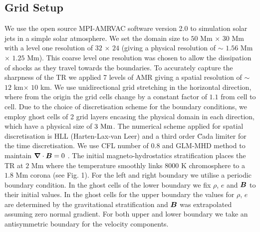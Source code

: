 \subsection{Grid Setup}
\label{sec:Grid_Setup}
We use the open source MPI-AMRVAC software version 2.0 \cite{Xia_2017} to simulation solar jets in a simple solar atmosphere. We set the domain size to $50$ Mm $\times$ $30$ Mm with a level one resolution of $32$ $\times$ $24$ (giving a physical resolution of $\sim$ $1.56$ Mm $\times$ $1.25$ Mm). This coarse level one resolution was chosen to allow the dissipation of shocks as they travel towards the boundaries. To accurately capture the sharpness of the TR we applied 7 levels of AMR giving a spatial resolution of $\sim$ $12$ km$\times$ $10$ km. We use unidirectional grid stretching in the horizontal direction, where from the origin the grid cells change by a constant factor of $1.1$ from cell to cell. Due to the choice of discretisation scheme for the boundary conditions, we employ ghost cells of 2 grid layers encasing the physical domain in each direction, which have a physical size of $3 \ \rm{Mm}$. The numerical scheme applied for spatial discretisation is HLL (Harten-Lax-van Leer) \cite{hll_1983} and a third order \u{C}ada limiter \citep{CADA20094118} for the time discretisation. We use CFL number of $0.8$ and GLM-MHD method to maintain $\boldsymbol{\nabla} \cdot \boldsymbol{B}=0$ \citep{DEDNER2002645}. The initial magneto-hydrostatics stratification places the TR at $2$ Mm where the temperature smoothly links $8000$ K chromosphere to a $1.8$ Mm corona (see Fig. 1). For the left and right boundary we utilise a periodic boundary condition. In the  ghost cells of the lower boundary we fix $\rho$, $e$ and $\boldsymbol{B}$ to their initial values. In the ghost cells for the upper boundary the values for $\rho$, $e$ are determined by the gravitational stratification and $\boldsymbol{B}$ was extrapolated assuming zero normal gradient. For both upper and lower boundary we take an antisymmetric boundary for the velocity components.
